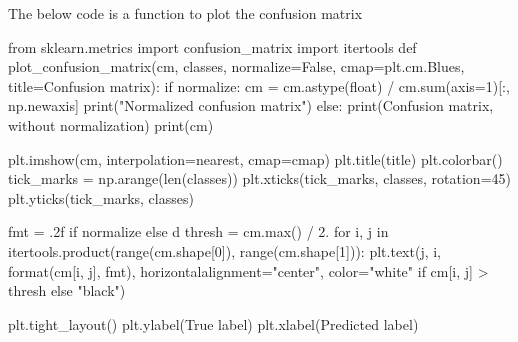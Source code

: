 \documentclass[
  letterpaper,
  DIV=11,
  numbers=noendperiod]{scrartcl}
\newenvironment{Shaded}{\begin{snugshade}}{\end{snugshade}}
\newcommand{\BuiltInTok}[1]{\textcolor[rgb]{0.00,0.23,0.31}{#1}}
\newcommand{\ControlFlowTok}[1]{\textcolor[rgb]{0.00,0.23,0.31}{#1}}
\newcommand{\DecValTok}[1]{\textcolor[rgb]{0.68,0.00,0.00}{#1}}
\newcommand{\FloatTok}[1]{\textcolor[rgb]{0.68,0.00,0.00}{#1}}
\newcommand{\ImportTok}[1]{\textcolor[rgb]{0.00,0.46,0.62}{#1}}
\newcommand{\KeywordTok}[1]{\textcolor[rgb]{0.00,0.23,0.31}{#1}}
\newcommand{\NormalTok}[1]{\textcolor[rgb]{0.00,0.23,0.31}{#1}}
\newcommand{\OperatorTok}[1]{\textcolor[rgb]{0.37,0.37,0.37}{#1}}
\newcommand{\StringTok}[1]{\textcolor[rgb]{0.13,0.47,0.30}{#1}}
\newcommand{\VariableTok}[1]{\textcolor[rgb]{0.07,0.07,0.07}{#1}}
\begin{document}
The below code is a function to plot the confusion matrix

\begin{Shaded}
\begin{Highlighting}[]
\ImportTok{from}\NormalTok{ sklearn.metrics }\ImportTok{import}\NormalTok{ confusion\_matrix}
\ImportTok{import}\NormalTok{ itertools}
\KeywordTok{def}\NormalTok{ plot\_confusion\_matrix(cm, classes, normalize}\OperatorTok{=}\VariableTok{False}\NormalTok{, cmap}\OperatorTok{=}\NormalTok{plt.cm.Blues, title}\OperatorTok{=}\StringTok{\textquotesingle{}Confusion matrix\textquotesingle{}}\NormalTok{):}
    \ControlFlowTok{if}\NormalTok{ normalize:}
\NormalTok{        cm }\OperatorTok{=}\NormalTok{ cm.astype(}\StringTok{\textquotesingle{}float\textquotesingle{}}\NormalTok{) }\OperatorTok{/}\NormalTok{ cm.}\BuiltInTok{sum}\NormalTok{(axis}\OperatorTok{=}\DecValTok{1}\NormalTok{)[:, np.newaxis]}
        \BuiltInTok{print}\NormalTok{(}\StringTok{"Normalized confusion matrix"}\NormalTok{)}
    \ControlFlowTok{else}\NormalTok{:}
        \BuiltInTok{print}\NormalTok{(}\StringTok{\textquotesingle{}Confusion matrix, without normalization\textquotesingle{}}\NormalTok{)}
    \BuiltInTok{print}\NormalTok{(cm)}

\NormalTok{    plt.imshow(cm, interpolation}\OperatorTok{=}\StringTok{\textquotesingle{}nearest\textquotesingle{}}\NormalTok{, cmap}\OperatorTok{=}\NormalTok{cmap)}
\NormalTok{    plt.title(title)}
\NormalTok{    plt.colorbar()}
\NormalTok{    tick\_marks }\OperatorTok{=}\NormalTok{ np.arange(}\BuiltInTok{len}\NormalTok{(classes))}
\NormalTok{    plt.xticks(tick\_marks, classes, rotation}\OperatorTok{=}\DecValTok{45}\NormalTok{)}
\NormalTok{    plt.yticks(tick\_marks, classes)}

\NormalTok{    fmt }\OperatorTok{=} \StringTok{\textquotesingle{}.2f\textquotesingle{}} \ControlFlowTok{if}\NormalTok{ normalize }\ControlFlowTok{else} \StringTok{\textquotesingle{}d\textquotesingle{}}
\NormalTok{    thresh }\OperatorTok{=}\NormalTok{ cm.}\BuiltInTok{max}\NormalTok{() }\OperatorTok{/} \FloatTok{2.}
    \ControlFlowTok{for}\NormalTok{ i, j }\KeywordTok{in}\NormalTok{ itertools.product(}\BuiltInTok{range}\NormalTok{(cm.shape[}\DecValTok{0}\NormalTok{]), }\BuiltInTok{range}\NormalTok{(cm.shape[}\DecValTok{1}\NormalTok{])):}
\NormalTok{        plt.text(j, i, }\BuiltInTok{format}\NormalTok{(cm[i, j], fmt),}
\NormalTok{                 horizontalalignment}\OperatorTok{=}\StringTok{"center"}\NormalTok{,}
\NormalTok{                 color}\OperatorTok{=}\StringTok{"white"} \ControlFlowTok{if}\NormalTok{ cm[i, j] }\OperatorTok{\textgreater{}}\NormalTok{ thresh }\ControlFlowTok{else} \StringTok{"black"}\NormalTok{)}

\NormalTok{    plt.tight\_layout()}
\NormalTok{    plt.ylabel(}\StringTok{\textquotesingle{}True label\textquotesingle{}}\NormalTok{)}
\NormalTok{    plt.xlabel(}\StringTok{\textquotesingle{}Predicted label\textquotesingle{}}\NormalTok{)}
\end{Highlighting}
\end{Shaded}
\end{document}
